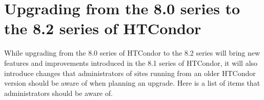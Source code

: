 \section{\label{sec:to-8.2}Upgrading from the 8.0 series to the 8.2 series of HTCondor}

While upgrading from the 8.0 series of HTCondor to the 8.2 series 
will bring 
new features and improvements introduced in the 8.1 series of HTCondor,
it will
also introduce changes that administrators of sites running from an older
HTCondor version should be aware of when planning an upgrade.  
Here is a list of items that administrators should be aware of.

